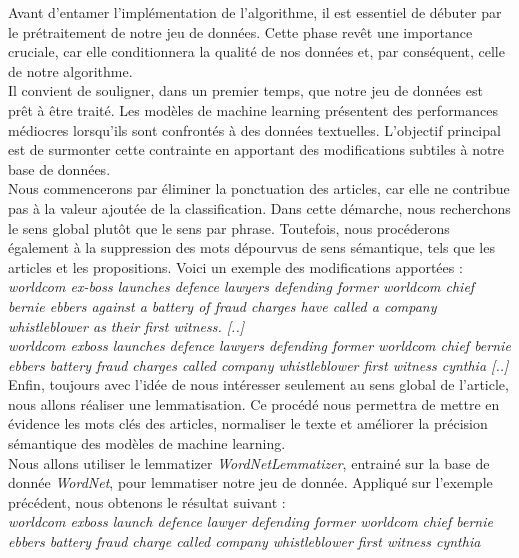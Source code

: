 \documentclass[a4paper,12pt]{article}
\begin{document}
Avant d'entamer l'implémentation de l'algorithme, il est essentiel de débuter par le prétraitement de notre jeu de données. Cette phase revêt une importance cruciale, car elle conditionnera la qualité de nos données et, par conséquent, celle de notre algorithme.\\

Il convient de souligner, dans un premier temps, que notre jeu de données est prêt à être traité. Les modèles de machine learning présentent des performances médiocres lorsqu'ils sont confrontés à des données textuelles. L'objectif principal est de surmonter cette contrainte en apportant des modifications subtiles à notre base de données.\\

Nous commencerons par éliminer la ponctuation des articles, car elle ne contribue pas à la valeur ajoutée de la classification. Dans cette démarche, nous recherchons le sens global plutôt que le sens par phrase. Toutefois, nous procéderons également à la suppression des mots dépourvus de sens sémantique, tels que les articles et les propositions. Voici un exemple des modifications apportées :\\

\textit{worldcom ex-boss launches defence lawyers defending former worldcom chief bernie ebbers against a battery of fraud charges have called a company whistleblower as their first witness. [..]}\\
\textit{worldcom exboss launches defence lawyers defending former worldcom chief bernie ebbers battery fraud charges called company whistleblower first witness cynthia [..]}\\

Enfin, toujours avec l'idée de nous intéresser seulement au sens global de l'article, nous allons réaliser une lemmatisation. Ce procédé nous permettra de mettre en évidence les mots clés des articles, normaliser le texte et améliorer la précision sémantique des modèles de machine learning.\\
Nous allons utiliser le lemmatizer \textit{WordNetLemmatizer}, entrainé sur la base de donnée \textit{WordNet}, pour lemmatiser notre jeu de donnée. Appliqué sur l'exemple précédent, nous obtenons le résultat suivant : \\

\textit{worldcom exboss launch defence lawyer defending former worldcom chief bernie ebbers battery fraud charge called company whistleblower first witness cynthia}\\
\end{document}
